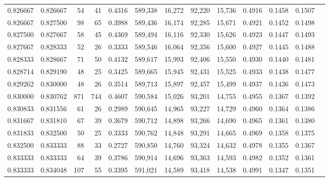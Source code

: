 \begin{tabular}{rrrrrrrrrrrrr}
0.826667 & 0.826667 &    54 &  41 &                                     0.4316 & 589,338 &  16,272 &  92,220 &  15,736 & 0.4916 & 0.1458 & 0.1507 \\
0.826667 & 0.827500 &    98 &  65 &                                     0.3988 & 589,436 &  16,174 &  92,285 &  15,671 & 0.4921 & 0.1452 & 0.1498 \\
0.827500 & 0.827667 &    58 &  45 &                                     0.4369 & 589,494 &  16,116 &  92,330 &  15,626 & 0.4923 & 0.1447 & 0.1493 \\
0.827667 & 0.828333 &    52 &  26 &                                     0.3333 & 589,546 &  16,064 &  92,356 &  15,600 & 0.4927 & 0.1445 & 0.1488 \\
0.828333 & 0.828667 &    71 &  50 &                                     0.4132 & 589,617 &  15,993 &  92,406 &  15,550 & 0.4930 & 0.1440 & 0.1481 \\
0.828714 & 0.829190 &    48 &  25 &                                     0.3425 & 589,665 &  15,945 &  92,431 &  15,525 & 0.4933 & 0.1438 & 0.1477 \\
0.829262 & 0.830000 &    48 &  26 &                                     0.3514 & 589,713 &  15,897 &  92,457 &  15,499 & 0.4937 & 0.1436 & 0.1473 \\
0.830000 & 0.830762 &   871 & 744 &                                     0.4607 & 590,584 &  15,026 &  93,201 &  14,755 & 0.4955 & 0.1367 & 0.1392 \\
0.830833 & 0.831556 &    61 &  26 &                                     0.2989 & 590,645 &  14,965 &  93,227 &  14,729 & 0.4960 & 0.1364 & 0.1386 \\
0.831667 & 0.831810 &    67 &  39 &                                     0.3679 & 590,712 &  14,898 &  93,266 &  14,690 & 0.4965 & 0.1361 & 0.1380 \\
0.831833 & 0.832500 &    50 &  25 &                                     0.3333 & 590,762 &  14,848 &  93,291 &  14,665 & 0.4969 & 0.1358 & 0.1375 \\
0.832500 & 0.833333 &    88 &  33 &                                     0.2727 & 590,850 &  14,760 &  93,324 &  14,632 & 0.4978 & 0.1355 & 0.1367 \\
0.833333 & 0.833333 &    64 &  39 &                                     0.3786 & 590,914 &  14,696 &  93,363 &  14,593 & 0.4982 & 0.1352 & 0.1361 \\
0.833333 & 0.834048 &   107 &  55 &                                     0.3395 & 591,021 &  14,589 &  93,418 &  14,538 & 0.4991 & 0.1347 & 0.1351 \\

\end{tabular}
